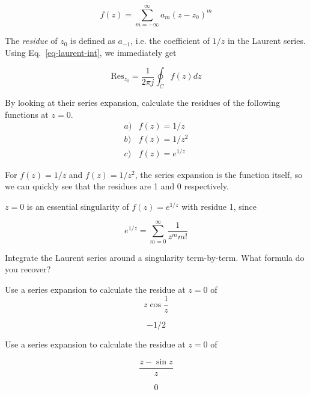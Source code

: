 \begin{equation}
f(z)= \sum_{m=-\infty}^{\infty} a_m (z-z_0)^m
\end{equation} 

The \emph{residue} of $z_0$ is defined as $a_{-1}$, i.e. the coefficient of $1/z$ in the Laurent series. Using Eq.~\ref{eq-laurent-int}, we immediately get

\begin{equation}
\mathrm{Res}_{z_0}=\frac{1}{2 \pi j }  \oint_{{C}} f(z) dz \label{eq-res-int}
\end{equation}

\begin{cue}
  By looking at their series expansion, calculate the residues of the following functions at $z=0$.
  $$\begin{array}{lcll}a) & f(z)=1/z \\b) & f(z)=1/z^2 \\c) & f(z)=e^{1/z}\end{array}$$
\end{cue}

For $f(z)=1/z$ and $f(z)=1/z^2$, the series expansion is the function itself, so we can quickly see that the residues are 1 and 0 respectively.

$z=0$ is an essential singularity of $f(z)=e^{1/z}$ with residue 1, since

$$e^{1/z} = \sum_{m=0}^{\infty} \frac{1}{z^m m!} $$

\pagebreak 

\begin{exer}
  Integrate the Laurent series around a singularity term-by-term. What formula do you recover?
\end{exer}

\begin{exer}
  Use a series expansion to calculate the residue at $z=0$ of
  $$z \cos \frac{1}{z}$$
  \begin{sol}
    $$-1/2$$
  \end{sol}
\end{exer}

\begin{exer}
  Use a series expansion to calculate the residue at $z=0$ of

  $$\frac{z - \sin z}{z}$$
  \begin{sol}
    $$0$$
  \end{sol}
\end{exer}

